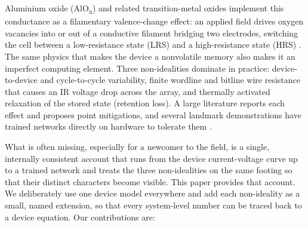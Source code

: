 \documentclass[conference]{IEEEtran}
\begin{document}
Aluminium oxide (AlO\textsubscript{x}) and related transition-metal oxides
implement this conductance as a filamentary valence-change effect: an applied
field drives oxygen vacancies into or out of a conductive filament bridging two
electrodes, switching the cell between a low-resistance state (LRS) and a
high-resistance state (HRS) \cite{ielmini2016}. The same physics that makes the
device a nonvolatile memory also makes it an imperfect computing element. Three
non-idealities dominate in practice: device-to-device and cycle-to-cycle
variability, finite wordline and bitline wire resistance that causes an IR
voltage drop across the array, and thermally activated relaxation of the stored
state (retention loss). A large literature reports each effect and proposes
point mitigations, and several landmark demonstrations have trained networks
directly on hardware to tolerate them \cite{prezioso2015, yao2020, li2018}.

What is often missing, especially for a newcomer to the field, is a single,
internally consistent account that runs from the device current-voltage curve up
to a trained network and treats the three non-idealities on the same footing so
that their distinct characters become visible. This paper provides that account.
We deliberately use one device model everywhere and add each non-ideality as a
small, named extension, so that every system-level number can be traced back to a
device equation. Our contributions are:
\end{document}
